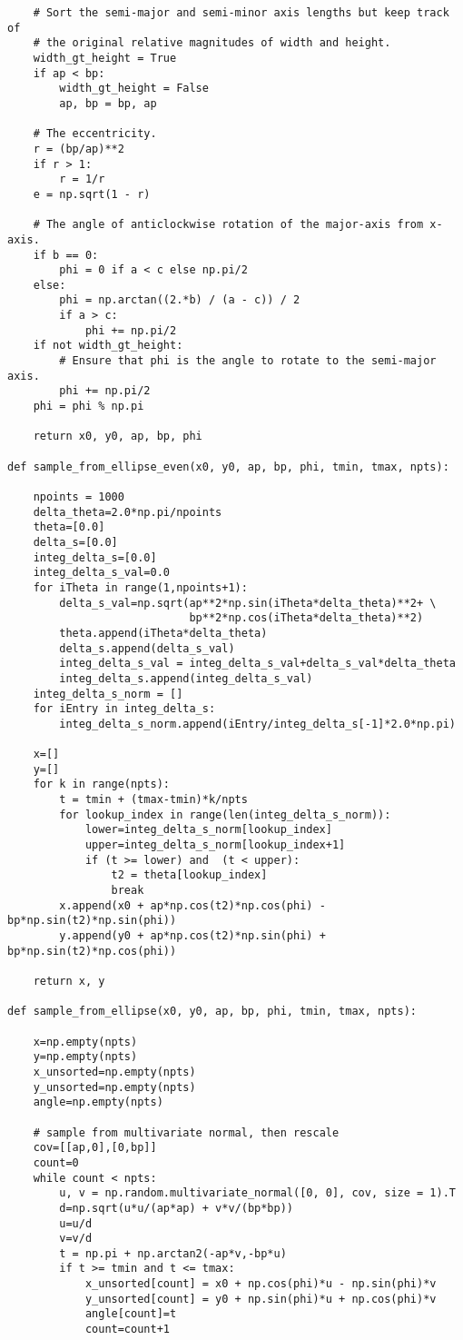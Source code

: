 \documentclass[oneside,10pt]{book}
\begin{document}
\begin{lstlisting}
    # Sort the semi-major and semi-minor axis lengths but keep track of
    # the original relative magnitudes of width and height.
    width_gt_height = True
    if ap < bp:
        width_gt_height = False
        ap, bp = bp, ap

    # The eccentricity.
    r = (bp/ap)**2
    if r > 1:
        r = 1/r
    e = np.sqrt(1 - r)

    # The angle of anticlockwise rotation of the major-axis from x-axis.
    if b == 0:
        phi = 0 if a < c else np.pi/2
    else:
        phi = np.arctan((2.*b) / (a - c)) / 2
        if a > c:
            phi += np.pi/2
    if not width_gt_height:
        # Ensure that phi is the angle to rotate to the semi-major axis.
        phi += np.pi/2
    phi = phi % np.pi

    return x0, y0, ap, bp, phi

def sample_from_ellipse_even(x0, y0, ap, bp, phi, tmin, tmax, npts):

    npoints = 1000
    delta_theta=2.0*np.pi/npoints
    theta=[0.0]
    delta_s=[0.0]
    integ_delta_s=[0.0]
    integ_delta_s_val=0.0
    for iTheta in range(1,npoints+1):
        delta_s_val=np.sqrt(ap**2*np.sin(iTheta*delta_theta)**2+ \
                            bp**2*np.cos(iTheta*delta_theta)**2)
        theta.append(iTheta*delta_theta)
        delta_s.append(delta_s_val)
        integ_delta_s_val = integ_delta_s_val+delta_s_val*delta_theta
        integ_delta_s.append(integ_delta_s_val)
    integ_delta_s_norm = []
    for iEntry in integ_delta_s:
        integ_delta_s_norm.append(iEntry/integ_delta_s[-1]*2.0*np.pi)

    x=[]
    y=[]
    for k in range(npts):
        t = tmin + (tmax-tmin)*k/npts
        for lookup_index in range(len(integ_delta_s_norm)):
            lower=integ_delta_s_norm[lookup_index]
            upper=integ_delta_s_norm[lookup_index+1]
            if (t >= lower) and  (t < upper):
                t2 = theta[lookup_index]
                break
        x.append(x0 + ap*np.cos(t2)*np.cos(phi) - bp*np.sin(t2)*np.sin(phi))
        y.append(y0 + ap*np.cos(t2)*np.sin(phi) + bp*np.sin(t2)*np.cos(phi))

    return x, y

def sample_from_ellipse(x0, y0, ap, bp, phi, tmin, tmax, npts):

    x=np.empty(npts)
    y=np.empty(npts)
    x_unsorted=np.empty(npts)
    y_unsorted=np.empty(npts)
    angle=np.empty(npts)

    # sample from multivariate normal, then rescale
    cov=[[ap,0],[0,bp]]
    count=0
    while count < npts:
        u, v = np.random.multivariate_normal([0, 0], cov, size = 1).T
        d=np.sqrt(u*u/(ap*ap) + v*v/(bp*bp))
        u=u/d
        v=v/d
        t = np.pi + np.arctan2(-ap*v,-bp*u)
        if t >= tmin and t <= tmax:
            x_unsorted[count] = x0 + np.cos(phi)*u - np.sin(phi)*v
            y_unsorted[count] = y0 + np.sin(phi)*u + np.cos(phi)*v
            angle[count]=t
            count=count+1


\end{lstlisting}
\end{document}
